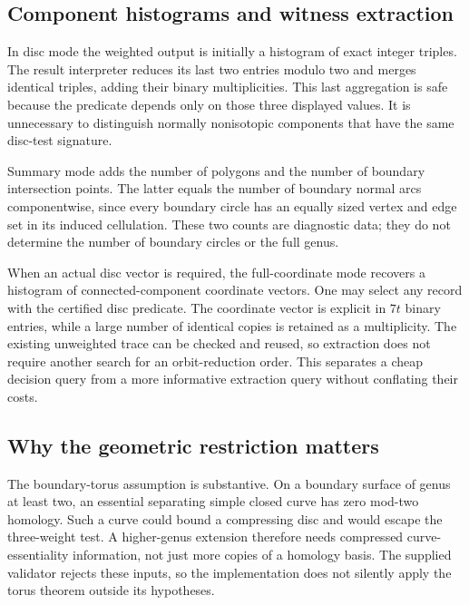 


\subsection{Component histograms and witness extraction}

In disc mode the weighted output is initially a histogram of exact integer
triples. The result interpreter reduces its last two entries modulo two and
merges identical triples, adding their binary multiplicities. This last
aggregation is safe because the predicate depends only on those three
displayed values. It is unnecessary to distinguish normally nonisotopic
components that have the same disc-test signature.

Summary mode adds the number of polygons and the number of boundary
intersection points. The latter equals the number of boundary normal arcs
componentwise, since every boundary circle has an equally sized vertex and
edge set in its induced cellulation. These two counts are diagnostic data;
they do not determine the number of boundary circles or the full genus.

When an actual disc vector is required, the full-coordinate mode recovers a
histogram of connected-component coordinate vectors. One may select any
record with the certified disc predicate. The coordinate vector is explicit
in $7t$ binary entries, while a large number of identical copies is retained
as a multiplicity. The existing unweighted trace can be checked and reused,
so extraction does not require another search for an orbit-reduction order.
This separates a cheap decision query from a more informative extraction
query without conflating their costs.

\subsection{Why the geometric restriction matters}

The boundary-torus assumption is substantive. On a boundary surface of genus
at least two, an essential separating simple closed curve has zero mod-two
homology. Such a curve could bound a compressing disc and would escape the
three-weight test. A higher-genus extension therefore needs compressed
curve-essentiality information, not just more copies of a homology basis.
The supplied validator rejects these inputs, so the implementation does not
silently apply the torus theorem outside its hypotheses.
